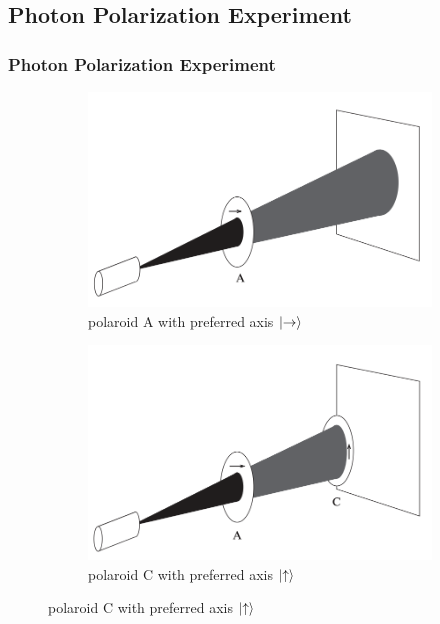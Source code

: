 \documentclass{beamer}
\begin{document}
\subsection{Photon Polarization Experiment}
\begin{frame}
  \frametitle{Photon Polarization Experiment}
  \begin{figure}
    \centering
    \begin{subfigure}[b]{0.3\textwidth}
      \centering
      \includegraphics[scale=0.12]{figures/polarization-0}
      \caption{polaroid A with preferred axis $\ket{\rightarrow}$}
      \label{fig:polarization-0}
    \end{subfigure}
    \hfill
    \begin{subfigure}[b]{0.3\textwidth}
      \centering
      \includegraphics[scale=0.12]{figures/polarization-1}
      \caption{polaroid C with preferred axis $\ket{\uparrow}$}
      \label{fig:polarization-1}
    \end{subfigure}
    \hfill

\end{figure}
\end{frame}
\end{document}
